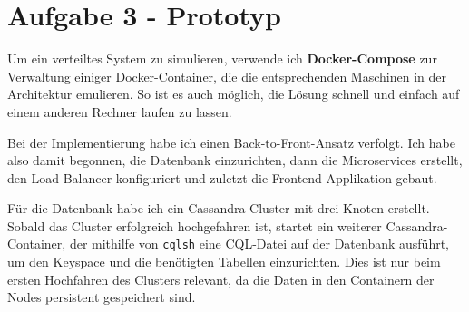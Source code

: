 \documentclass[12pt]{article}
\begin{document}
\section*{Aufgabe 3 - Prototyp}
Um ein verteiltes System zu simulieren, verwende ich \textbf{Docker-Compose} zur Verwaltung einiger Docker-Container, die die entsprechenden Maschinen in der Architektur emulieren.
So ist es auch möglich, die Lösung schnell und einfach auf einem anderen Rechner laufen zu lassen.

Bei der Implementierung habe ich einen Back-to-Front-Ansatz verfolgt.
Ich habe also damit begonnen, die Datenbank einzurichten, dann die Microservices erstellt, den Load-Balancer konfiguriert und zuletzt die Frontend-Applikation gebaut.

Für die Datenbank habe ich ein Cassandra-Cluster mit drei Knoten erstellt. Sobald das Cluster erfolgreich hochgefahren ist, startet ein weiterer Cassandra-Container, der mithilfe von \texttt{cqlsh} eine CQL-Datei auf der Datenbank ausführt, um den Keyspace und die benötigten Tabellen einzurichten. Dies ist nur beim ersten Hochfahren des Clusters relevant, da die Daten in den Containern der Nodes persistent gespeichert sind.


	
\end{document}
